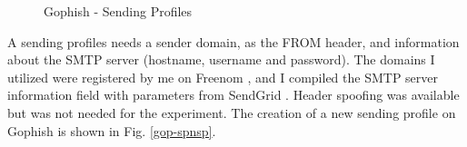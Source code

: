 \documentclass[a4paper]{article}
\begin{document}
\begin{figure}[H]
	\centering
	\caption{Gophish - Sending Profiles}
	\label{gop-sp}
\end{figure}

\noindent
A sending profiles needs a sender domain, as the FROM header, and information about the SMTP server (hostname, username and password). The domains I utilized were registered by me on Freenom \cite{tools-freenom}, and I compiled the SMTP server information field with parameters from SendGrid  \cite{tools-sendgrid}. Header spoofing was available but was not needed for the experiment. The creation of a new sending profile on Gophish is shown in Fig. \ref{gop-spnsp}.
\end{document}
